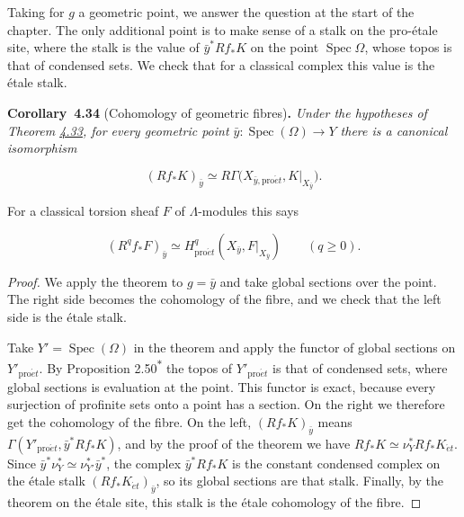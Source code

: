 \documentclass[11pt]{article}
\newenvironment{bpstatement}[2]{\par\addvspace{0.6\baselineskip}\noindent\textbf{#1}#2\textbf{.}\enspace\ignorespaces}
  {\par\addvspace{0.4\baselineskip}}
\newenvironment{bpstatementit}[2]{\begin{bpstatement}{#1}{#2}\itshape\ignorespaces}{\end{bpstatement}}
\newcommand{\bpout}[1]{#1\textsuperscript{\hyperlink{bp-outside}{\ensuremath{\ast}}}}
\begin{document}
\label{bp101}%
Taking for \(g\) a geometric point, we answer the question at the start of the chapter. The only additional point is to make sense of a stalk on the pro-étale site, where the stalk is the value of \(\bar y^*Rf_*K\) on the point \(\operatorname{Spec}\Omega\), whose topos is that of condensed sets. We check that for a classical complex this value is the étale stalk.

\label{bp102}%
\begin{bpstatementit}{Corollary~4.34}{ (Cohomology of geometric fibres)}
Under the hypotheses of Theorem \hyperref[bp98]{4.33}, for every geometric point \(\bar y:\operatorname{Spec}(\Omega)\to Y\) there is a canonical isomorphism

\[
(Rf_*K)_{\bar y}\simeq
R\Gamma\bigl(X_{\bar y,\mathrm{pro}\acute{e}t},K|_{X_{\bar y}}\bigr).
\]

For a classical torsion sheaf \(F\) of \(\Lambda\)-modules this says

\[
(R^qf_*F)_{\bar y}\simeq
H^q_{\mathrm{pro}\acute{e}t}(X_{\bar y},F|_{X_{\bar y}})\qquad(q\geq0).
\]
\end{bpstatementit}

\begin{proof}[{Proof}]\label{bp103}%
We apply the theorem to \(g=\bar y\) and take global sections over the point. The right side becomes the cohomology of the fibre, and we check that the left side is the étale stalk.

Take \(Y'=\operatorname{Spec}(\Omega)\) in the theorem and apply the functor of global sections on \(Y'_{\mathrm{pro}\acute{e}t}\). By Proposition \bpout{2.50} the topos of \(Y'_{\mathrm{pro}\acute{e}t}\) is that of condensed sets, where global sections is evaluation at the point. This functor is exact, because every surjection of profinite sets onto a point has a section. On the right we therefore get the cohomology of the fibre. On the left, \((Rf_*K)_{\bar y}\) means \(\Gamma(Y'_{\mathrm{pro}\acute{e}t},\bar y^*Rf_*K)\), and by the proof of the theorem we have \(Rf_*K\simeq\nu_Y^*Rf_*K_{\acute{e}t}\). Since \(\bar y^*\nu_Y^*\simeq\nu_{Y'}^*\bar y^*\), the complex \(\bar y^*Rf_*K\) is the constant condensed complex on the étale stalk \((Rf_*K_{\acute{e}t})_{\bar y}\), so its global sections are that stalk. Finally, by the theorem on the étale site, this stalk is the étale cohomology of the fibre.
\end{proof}
\end{document}
